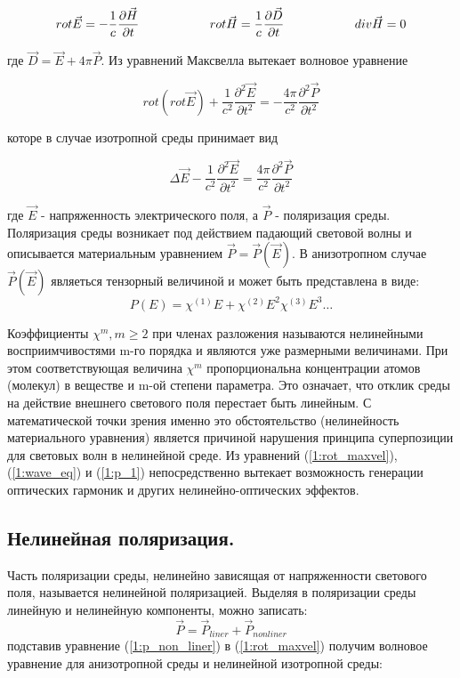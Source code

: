 \begin{equation}\label{1:maxvel}
rot\vec{E} = - \frac{ 1 }{ c}\frac{\partial \vec{H} }{\partial t}
\hspace{20mm}
rot\vec{H} =  \frac{ 1 }{ c}\frac{\partial \vec{D} }{\partial t}
\hspace{20mm}
div\vec{H} = 0
\end{equation}

где $ \vec{D} = \vec{E} + 4\pi \vec{P}$. Из уравнений Максвелла вытекает волновое уравнение

\begin{equation}\label{1:rot_maxvel}
rot(rot\vec{E}) + \frac{ 1 }{ c^2 }\frac{\partial^2 \vec{E} }{\partial t^2} = - \frac{ 4\pi }{ c^2 }\frac{\partial^2 \vec{P} }{\partial t^2}
\end{equation}

которе в случае изотропной среды принимает вид

\begin{equation}\label{1:wave_eq}
\Delta\vec{E} - \frac{ 1 }{ c^2 }\frac{\partial^2 \vec{E} }{\partial t^2} =  \frac{ 4\pi }{ c^2 }\frac{\partial^2 \vec{P} }{\partial t^2}
\end{equation}

где $\vec{E}$ - напряженность электрического поля, а $\vec{P}$ - поляризация среды. Поляризация среды возникает под действием падающий световой волны и описывается материальным уравнением $\vec{P} = \vec{P}(\vec{E})$.
В анизотропном случае $\vec{P}(\vec{E})$ являеться тензорный величиной и может быть представлена в виде:
\begin{equation}\label{1:p_1}
P(E) = \chi^{(1)}E + \chi^{(2)}E^2 \chi^{(3)}E^3\dots
\end{equation}

Коэффициенты $\chi^{m}, m \ge 2$ при членах разложения называются нелинейными восприимчивостями m-го порядка и являются уже размерными величинами. При этом соответствующая величина $\chi^{m}$ пропорциональна концентрации атомов (молекул) в веществе и m-ой степени параметра. Это означает, что отклик среды на действие внешнего светового поля перестает быть линейным.  С математической точки зрения именно это обстоятельство (нелинейность материального уравнения) является причиной нарушения принципа суперпозиции для световых волн в нелинейной среде. Из уравнений (\ref{1:rot_maxvel}), (\ref{1:wave_eq}) и (\ref{1:p_1}) непосредственно вытекает возможность генерации оптических гармоник и других нелинейно-оптических эффектов. 
\subsection{Нелинейная поляризация.} 
Часть поляризации среды, нелинейно зависящая от напряженности светового поля, называется нелинейной поляризацией.
Выделяя в поляризации среды линейную и нелинейную компоненты, можно
записать:
\begin{equation}\label{1:p_non_liner}
\vec{P} = \vec{P}_{liner} + \vec{P}_{nonliner}
\end{equation}
подставив уравнение  (\ref{1:p_non_liner}) в  (\ref{1:rot_maxvel}) получим волновое уравнение для анизотропной среды и нелинейной изотропной среды:

